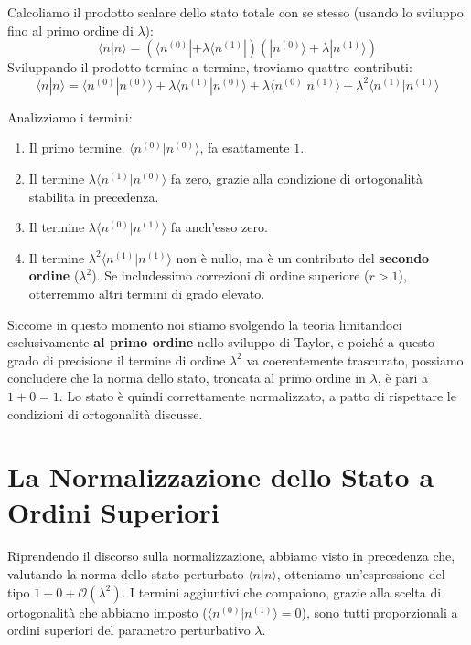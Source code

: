 Calcoliamo il prodotto scalare dello stato totale con se stesso (usando lo sviluppo fino al primo ordine di $\lambda$):
\begin{equation}
\langle n | n \rangle = \left( \langle n^{(0)}| + \lambda \langle n^{(1)}| \right) \left( |n^{(0)}\rangle + \lambda |n^{(1)}\rangle \right)
\end{equation}
Sviluppando il prodotto termine a termine, troviamo quattro contributi:
\begin{equation}
\langle n | n \rangle = \langle n^{(0)} | n^{(0)} \rangle + \lambda \langle n^{(1)} | n^{(0)} \rangle + \lambda \langle n^{(0)} | n^{(1)} \rangle + \lambda^2 \langle n^{(1)} | n^{(1)} \rangle
\end{equation}

Analizziamo i termini:
\begin{enumerate}
\item Il primo termine, $\langle n^{(0)} \vert{} n^{(0)} \rangle$, fa esattamente $1$.
\item Il termine $\lambda \langle n^{(1)} \vert{} n^{(0)} \rangle$ fa zero, grazie alla condizione di ortogonalità stabilita in precedenza.
\item Il termine $\lambda \langle n^{(0)} \vert{} n^{(1)} \rangle$ fa anch'esso zero.
\item Il termine $\lambda^2 \langle n^{(1)} \vert{} n^{(1)} \rangle$ non è nullo, ma è un contributo del \textbf{secondo ordine} ($\lambda^2$). Se includessimo correzioni di ordine superiore ($r>1$), otterremmo altri termini di grado elevato.
\end{enumerate}

Siccome in questo momento noi stiamo svolgendo la teoria limitandoci esclusivamente \textbf{al primo ordine} nello sviluppo di Taylor, e poiché a questo grado di precisione il termine di ordine $\lambda^2$ va coerentemente trascurato, possiamo concludere che la norma dello stato, troncata al primo ordine in $\lambda$, è pari a $1 + 0 = 1$. Lo stato è quindi correttamente normalizzato, a patto di rispettare le condizioni di ortogonalità discusse.
    

\section{La Normalizzazione dello Stato a Ordini Superiori}

Riprendendo il discorso sulla normalizzazione, abbiamo visto in precedenza che, valutando la norma dello stato perturbato $\langle n \vert{} n \rangle$, otteniamo un'espressione del tipo $1 + 0 + \mathcal{O}(\lambda^2)$.
I termini aggiuntivi che compaiono, grazie alla scelta di ortogonalità che abbiamo imposto ($\langle n^{(0)} \vert{} n^{(1)} \rangle = 0$), sono tutti proporzionali a ordini superiori del parametro perturbativo $\lambda$.

